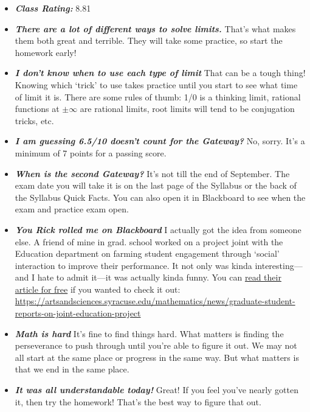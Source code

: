 \documentclass[11pt,letterpaper]{article}
\begin{document}
\begin{itemize}
\item {\bfseries\itshape Class Rating:} 8.81

\item {\bfseries\itshape There are a lot of different ways to solve limits.} That's what makes them both great and terrible. They will take some practice, so start the homework early!

\item {\bfseries\itshape I don't know when to use each type of limit} That can be a tough thing! Knowing which `trick' to use takes practice until you start to see what time of limit it is. There are some rules of thumb: 1/0 is a thinking limit, rational functions at $\pm \infty$ are rational limits, root limits will tend to be conjugation tricks, etc. 

\item {\bfseries\itshape I am guessing 6.5/10 doesn't count for the Gateway?} No, sorry. It's a minimum of 7 points for a passing score. 

\item {\bfseries\itshape When is the second Gateway?} It's not till the end of September. The exam date you will take it is on the last page of the Syllabus or the back of the Syllabus Quick Facts. You can also open it in Blackboard to see when the exam and practice exam open. 

\item {\bfseries\itshape You Rick rolled me on Blackboard} I actually got the idea from someone else. A friend of mine in grad. school worked on a project joint with the Education department on farming student engagement through `social' interaction to improve their performance. It not only was kinda interesting---and I hate to admit it---it was actually kinda funny. You can \href{https://www.youtube.com/watch?v=dQw4w9WgXcQ}{read their article for free} if you wanted to check it out: \href{https://www.youtube.com/watch?v=dQw4w9WgXcQ}{https://artsandsciences.syracuse.edu/mathematics/news/graduate-student-reports-on-joint-education-project}

\item {\bfseries\itshape Math is hard} It's fine to find things hard. What matters is finding the perseverance to push through until you're able to figure it out. We may not all start at the same place or progress in the same way. But what matters is that we end in the same place. 

\item {\bfseries\itshape It was all understandable today!} Great! If you feel you've nearly gotten it, then try the homework! That's the best way to figure that out. 


\end{itemize}
\end{document}

